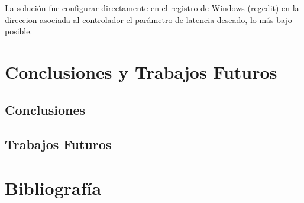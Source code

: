 \documentclass[12pt,a4paper]{article}
\let\stdsection\section
\renewcommand\section{\newpage\stdsection}
\begin{document}
La solución fue configurar directamente en el registro de Windows (regedit) en la direccion asociada al controlador el parámetro de latencia deseado, lo más bajo posible.


\section{Conclusiones y Trabajos Futuros}
\subsection{Conclusiones}
\subsection{Trabajos Futuros}

\section{Bibliografía}

\printbibliography[heading=none]%

\thispagestyle{empty}
\pagebreak
\newpage
\end{document}

